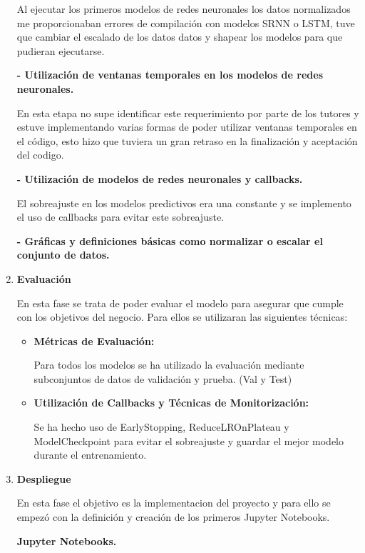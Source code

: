 \begin{enumerate}
	Al ejecutar los primeros modelos de redes neuronales los datos normalizados me proporcionaban errores de compilación con modelos SRNN o LSTM, tuve que cambiar el escalado de los datos datos y shapear los modelos para que pudieran ejecutarse.

\textbf{- Utilización de ventanas temporales en los modelos de redes neuronales.} 

	En esta etapa no supe identificar este requerimiento por parte de los tutores y estuve implementando varias formas de poder utilizar ventanas temporales en el código, esto hizo que tuviera un gran retraso en la finalización y aceptación del codigo.

\textbf{- Utilización de modelos de redes neuronales y callbacks.} 

	El sobreajuste en los modelos predictivos era una constante y se implemento el uso de callbacks para evitar este sobreajuste.


\textbf{- Gráficas y definiciones básicas como normalizar o escalar el conjunto de datos.}



\item
\textbf{Evaluación}


En esta fase se trata de poder evaluar el modelo para asegurar que cumple con los objetivos del negocio. Para ellos se utilizaran las siguientes técnicas:


	\begin{itemize}
	
	\item
	\textbf{Métricas de Evaluación:}

Para todos los modelos se ha utilizado la evaluación mediante subconjuntos de datos de validación y prueba. (Val y Test)

	\item
	\textbf{Utilización de Callbacks y Técnicas de Monitorización:}

 Se ha hecho uso de EarlyStopping, ReduceLROnPlateau y ModelCheckpoint para evitar el sobreajuste y guardar el mejor modelo durante el entrenamiento.
	\end{itemize}


\item
\textbf{Despliegue}

En esta fase el objetivo es la implementacion del proyecto y para ello se empezó con la definición y creación de los primeros Jupyter Notebooks.


\textbf{Jupyter Notebooks.} 


\end{enumerate}
